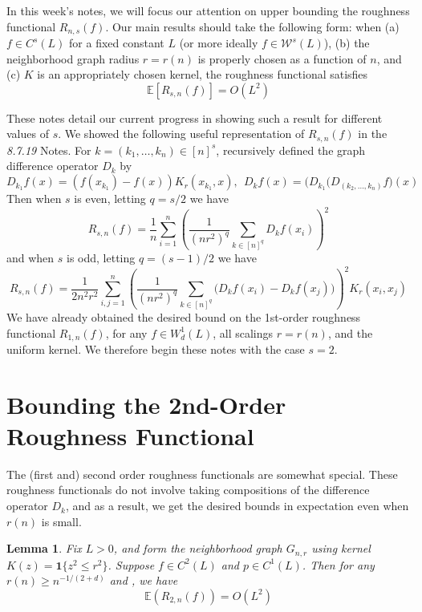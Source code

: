 \documentclass{article}
\newcommand{\1}{\mathbf{1}}
\newcommand{\Ebb}{\mathbb{E}}
\theoremstyle{alden}
\theoremstyle{aldenthm}
\newtheorem{lemma}{Lemma}
\theoremstyle{definition}
\theoremstyle{remark}
\begin{document}
In this week's notes, we will focus our attention on upper bounding the roughness functional $R_{n,s}(f)$. Our main results should take the following form: when (a) $f \in C^{s}(L)$ for a fixed constant $L$ (or more ideally $f \in \mathcal{W}^{s}(L)$), (b) the neighborhood graph radius $r = r(n)$ is properly chosen as a function of $n$, and (c) $K$ is an appropriately chosen kernel, the roughness functional satisfies
\begin{equation}
\label{eqn:roughness_functional_bound}
\mathbb{E}\left[R_{s,n}(f)\right] = O\left(L^2\right)
\end{equation}

These notes detail our current progress in showing such a result for different values of $s$. We showed the following useful representation of $R_{s,n}(f)$ in the \emph{8.7.19} Notes. For $k = (k_1,\ldots,k_n) \in [n]^s$, recursively defined the graph difference operator $D_k$ by 
\begin{equation*}
D_{k_1}f(x) = (f(x_{k_1}) - f(x))K_r(x_{k_1},x),~~ D_kf(x) = \bigl(D_{k_1}(D_{(k_2,\ldots,k_n)}f\bigr)(x)
\end{equation*}
Then when $s$ is even, letting $q = s/2$ we have
\begin{equation}
\label{eqn:roughness_functional_representation_even}
R_{s,n}(f) = \frac{1}{n}\sum_{i = 1}^{n} \left(\frac{1}{(nr^2)^q}\sum_{k \in [n]^q} D_kf(x_i)\right)^2
\end{equation}
and when $s$ is odd, letting $q = (s - 1)/2$ we have
\begin{equation}
\label{eqn:roughness_functional_representation_odd}
R_{s,n}(f) =  \frac{1}{2n^2r^2}\sum_{i,j = 1}^{n}\left(\frac{1}{(nr^2)^q}\sum_{k \in [n]^q}\bigl(D_kf(x_i) - D_kf(x_j)\bigr)\right)^2K_r(x_i,x_j)
\end{equation}
We have already obtained the desired bound on the 1st-order roughness functional $R_{1,n}(f)$, for any $f \in W_d^{1}(L)$, all scalings $r = r(n)$, and the uniform kernel. We therefore begin these notes with the case $s = 2$. 

\section{Bounding the 2nd-Order Roughness Functional}
The (first and) second order roughness functionals are somewhat special. These roughness functionals do not involve taking compositions of the difference operator $D_k$, and as a result, we get the desired bounds in expectation even when $r(n)$ is small. 
\begin{lemma}
	\label{lem:2nd_order_roughness_functional}
	Fix $L > 0$, and form the neighborhood graph $G_{n,r}$ using kernel $K(z) = \1\{z^2 \leq r^2\}$. Suppose $f \in C^2(L)$ and $p \in C^1(L)$. Then for any $r(n) \geq n^{-1/(2+d)}$ and , we have
	\begin{equation*}
	\Ebb(R_{2,n}(f)) = O(L^2)
	\end{equation*}
\end{lemma}
\end{document}
